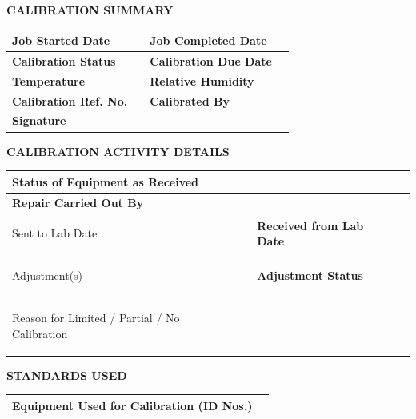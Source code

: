 \documentclass[a4paper,10pt]{article}
\newcommand{\sectiontitle}[1]{
\vspace{2mm}
\colorbox{sectiongray}{
\parbox{\dimexpr\linewidth-2\fboxsep}{
\textbf{\large #1}
}}
\vspace{1mm}
}
\begin{document}

\sectiontitle{CALIBRATION SUMMARY}

\begin{tabularx}{\textwidth}{|>{\bfseries}l|X|>{\bfseries}l|X|}
\hline
Job Started Date & & Job Completed Date & \\
\hline
Calibration Status & & Calibration Due Date & \\
\hline
Temperature & & Relative Humidity & \\
\hline
Calibration Ref. No. & & Calibrated By & \\
\hline
Signature & \multicolumn{3}{l|}{} \\
\hline
\end{tabularx}


\sectiontitle{CALIBRATION ACTIVITY DETAILS}

\begin{tabularx}{\textwidth}{|>{\bfseries}l|X|>{\bfseries}l|X|}
\hline

Status of Equipment as Received &
\multicolumn{3}{l|}{}
\\
\hline

Repair Carried Out By &
\multicolumn{3}{l|}{}
\\
\hline

Sent to Lab Date &
&
Received from Lab Date &
\\
\hline

Adjustment(s) &
&
Adjustment Status &
\\
\hline

Reason for Limited / Partial / No Calibration &
\multicolumn{3}{l|}{}
\\[6mm]
\hline

\end{tabularx}


\sectiontitle{STANDARDS USED}

\begin{tabularx}{\textwidth}{|>{\bfseries}l|X|}
\hline

Equipment Used for Calibration (ID Nos.)

&
\\[3mm]

\hline

\end{tabularx}
\end{document}
